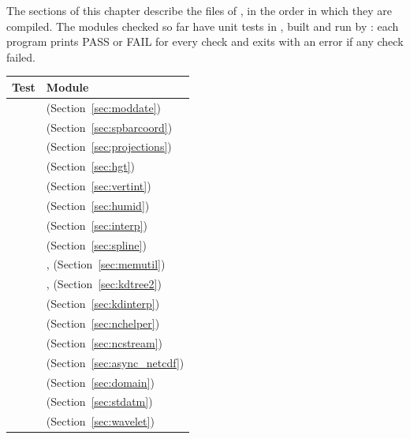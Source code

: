 The sections of this chapter describe the files of , in the
order in which they are compiled. The modules checked so far have unit
tests in , built and run by : each
program prints PASS or FAIL for every check and exits with an error if any
check failed.

\begin{longtable}{L{5cm} L{9cm}}
  \toprule
  \textbf{Test} & \textbf{Module} \\
  \midrule
  \endhead
  \bottomrule
  \endfoot
   &  (Section~\ref{sec:moddate}) \\
   & 
    (Section~\ref{sec:spbarcoord}) \\
   & 
    (Section~\ref{sec:projections}) \\
   &  (Section~\ref{sec:hgt}) \\
   &  (Section~\ref{sec:vertint}) \\
   &  (Section~\ref{sec:humid}) \\
   &  (Section~\ref{sec:interp}) \\
   &  (Section~\ref{sec:spline}) \\
   & , 
    (Section~\ref{sec:memutil}) \\
   & ,
     (Section~\ref{sec:kdtree2}) \\
   &  (Section~\ref{sec:kdinterp}) \\
   &  (Section~\ref{sec:nchelper}) \\
   &  (Section~\ref{sec:ncstream}) \\
   & 
    (Section~\ref{sec:async_netcdf}) \\
   &  (Section~\ref{sec:domain}) \\
   &  (Section~\ref{sec:stdatm}) \\
   &  (Section~\ref{sec:wavelet}) \\

\end{longtable}
